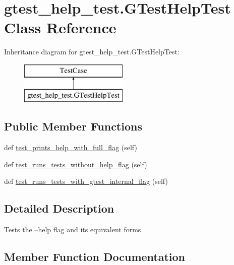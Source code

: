 \hypertarget{classgtest__help__test_1_1GTestHelpTest}{}\section{gtest\+\_\+help\+\_\+test.\+G\+Test\+Help\+Test Class Reference}
\label{classgtest__help__test_1_1GTestHelpTest}
Inheritance diagram for gtest\+\_\+help\+\_\+test.\+G\+Test\+Help\+Test\+:\begin{figure}[H]
\begin{center}
\leavevmode
\includegraphics[height=2.000000cm]{classgtest__help__test_1_1GTestHelpTest}
\end{center}
\end{figure}
\subsection*{Public Member Functions}
\begin{DoxyCompactItemize}
\item 
def \mbox{\hyperlink{classgtest__help__test_1_1GTestHelpTest_a74c433add31ea93060668aff46eaf9bc}{test\+\_\+prints\+\_\+help\+\_\+with\+\_\+full\+\_\+flag}} (self)
\item 
def \mbox{\hyperlink{classgtest__help__test_1_1GTestHelpTest_a1f9a5c73e25e66f9b8bf42f7dee11be9}{test\+\_\+runs\+\_\+tests\+\_\+without\+\_\+help\+\_\+flag}} (self)
\item 
def \mbox{\hyperlink{classgtest__help__test_1_1GTestHelpTest_ad15939700d2896b93127c78b6b0d7655}{test\+\_\+runs\+\_\+tests\+\_\+with\+\_\+gtest\+\_\+internal\+\_\+flag}} (self)
\end{DoxyCompactItemize}


\subsection{Detailed Description}
\begin{DoxyVerb}Tests the --help flag and its equivalent forms.\end{DoxyVerb}
 

\subsection{Member Function Documentation}
\mbox{\label{classgtest__help__test_1_1GTestHelpTest_a74c433add31ea93060668aff46eaf9bc}} 
